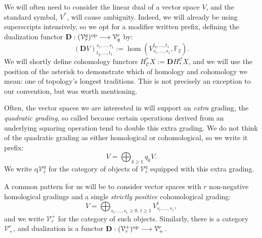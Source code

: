\documentclass[11pt]{amsart} \renewcommand{\baselinestretch}{1.2}
\theoremstyle{plain}
\theoremstyle{definition}
\renewcommand{\to}{\longrightarrow}
\newcommand{\calV}{\mathcal{V}}
\newcommand{\calc}{\mathcal{C}}
\newcommand{\vect}[2]{\calV^{#1}_{#2}}
\newcommand{\quadgrad}[1]{\mathrm{q}_{#1}}
\newcommand{\F}{\mathbb{F}}
\newcommand{\Ftwo}{\F_2}
\newcommand{\dual}{\mathbf{D}}
\begin{document}
\begin{Conventions and notation}
We will often need to consider the linear dual of a vector space $V$, and the standard symbol, $V^*$, will cause ambiguity. Indeed, we will already be using superscripts intensively, so we opt for a modifier written prefix, defining the dualization functor
$\dual:(\vect{q}{r})^\textup{op}\to\vect{r}{q}$ by:
\[(\dual V)_{t_q,\ldots,t_1}^{s_r,\ldots,s_1}:=\hom(V^{t_q,\ldots,t_1}_{s_r,\ldots,s_1},\Ftwo ).\]
We will shortly define cohomology functors
$H_{\calc}^*X:=\dual H^{\calc}_*X$, and we will use the position of the asterisk to demonstrate which of homology and cohomology we mean: one of topology's longest traditions. This is not precisely an exception to our convention, but was worth mentioning.

Often, the vector spaces we are interested in will support an \emph{extra} grading, the \emph{quadratic grading}, so called because certain operations derived from an underlying squaring operation tend to double this extra grading. We do not think of the quadratic grading as either homological or cohomological, so we write it prefix:
\[V=\textstyle\bigoplus_{k\geq1}q_kV.\]
We write $\quadgrad{}\vect{q}{r}$ for the category of objects of $\vect{q}{r}$ equipped with this extra grading.

A common pattern for us will be to consider vector spaces with $r$ non-negative homological gradings and a single \emph{strictly positive} cohomological grading:
\[V=\bigoplus_{s_r,\ldots,s_1\geq0,\,t\geq 1}V^{t}_{s_r,\ldots,s_1},\]
and we write $\vect{+}{r}$ for the category of such objects. Similarly, there is a category $\vect{r}{+}$, and  dualization is a functor $\dual:(\vect{+}{r})^\textup{op}\to\vect{r}{+}$.



\end{Conventions and notation}
\end{document}
